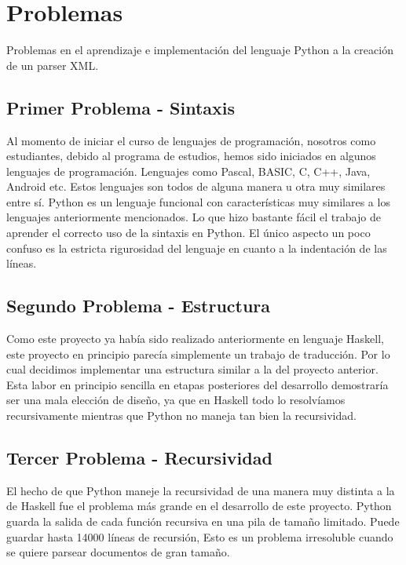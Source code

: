 \documentclass[11pt]{article} %
\begin{document}
\section{Problemas}


Problemas en el aprendizaje e implementación del lenguaje Python a la creación de un parser XML.



\subsection{Primer Problema - Sintaxis}

Al momento de iniciar el curso de lenguajes de programación, nosotros como estudiantes, debido al programa de estudios, hemos sido iniciados en algunos lenguajes de programación. Lenguajes como Pascal, BASIC, C, C++, Java, Android etc. Estos lenguajes son todos de alguna manera u otra muy similares entre sí. Python es un lenguaje funcional con características muy similares a los lenguajes anteriormente mencionados. Lo que hizo bastante fácil el trabajo de aprender el correcto uso de la sintaxis en Python. El  único aspecto un poco confuso es la estricta rigurosidad del lenguaje en cuanto a la indentación de las líneas.


\subsection{Segundo Problema - Estructura}

Como este proyecto ya había sido realizado anteriormente en lenguaje Haskell, este proyecto en principio parecía simplemente un trabajo de traducción. Por lo cual decidimos implementar una estructura similar a la del proyecto anterior. Esta labor en principio sencilla en etapas posteriores del desarrollo demostraría ser una mala elección de diseño, ya que en Haskell todo lo resolvíamos recursivamente mientras que Python no maneja tan bien la recursividad. 

\subsection{Tercer Problema - Recursividad}

El hecho de que Python maneje la recursividad de una manera muy distinta a la de Haskell fue el problema más grande en el desarrollo de este proyecto. Python guarda la salida de cada función recursiva en una pila de tamaño limitado. Puede guardar hasta 14000 líneas de recursión, Esto es un problema irresoluble cuando se quiere parsear documentos de gran tamaño.
\end{document}
